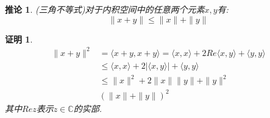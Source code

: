 \documentclass[a4paper,11pt]{article}
\theoremstyle{mystyle}
\newtheorem{Proof}{\hspace{2em}证明}[section]
\newtheorem{corollary}{\hspace{2em}推论}[section]
\begin{document}
\begin{corollary}
  (三角不等式)对于内积空间中的任意两个元素$x,y$有:
  \begin{equation*}
    \|x+y\|\leq\|x\|+\|y\|
  \end{equation*}
\end{corollary}
\begin{Proof}
  \begin{equation*}
  \begin{split}
     \|x+y\|^2& =\langle x+y,x+y\rangle=\langle x,x\rangle+2Re\langle x,y\rangle+\langle y,y\rangle \\
       & \leq\langle x,x\rangle+2|\langle x,y\rangle|+\langle y,y\rangle \\
       & \leq\|x\|^2+2\|x\|\|y\|+\|y\|^2 \\
       & (\|x\|+\|y\|)^2
  \end{split}
  \end{equation*}
  其中$Re z$表示$z\in \mathbb{C}$的实部.
\end{Proof}
\end{document}
